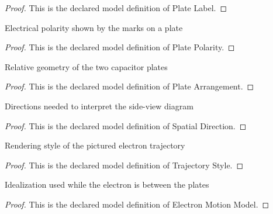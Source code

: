 \begin{proof}
  This is the declared model definition of Plate Label.
\end{proof}
\begin{definition}
  \label{def:physics:phyx-mini-0836:phyxminiproblems-problemphyxmini0836-platepolarity}
  Electrical polarity shown by the marks on a plate
\end{definition}
\begin{proof}
  This is the declared model definition of Plate Polarity.
\end{proof}
\begin{definition}
  \label{def:physics:phyx-mini-0836:phyxminiproblems-problemphyxmini0836-platearrangement}
  Relative geometry of the two capacitor plates
\end{definition}
\begin{proof}
  This is the declared model definition of Plate Arrangement.
\end{proof}
\begin{definition}
  \label{def:physics:phyx-mini-0836:phyxminiproblems-problemphyxmini0836-spatialdirection}
  Directions needed to interpret the side-view diagram
\end{definition}
\begin{proof}
  This is the declared model definition of Spatial Direction.
\end{proof}
\begin{definition}
  \label{def:physics:phyx-mini-0836:phyxminiproblems-problemphyxmini0836-trajectorystyle}
  Rendering style of the pictured electron trajectory
\end{definition}
\begin{proof}
  This is the declared model definition of Trajectory Style.
\end{proof}
\begin{definition}
  \label{def:physics:phyx-mini-0836:phyxminiproblems-problemphyxmini0836-electronmotionmodel}
  Idealization used while the electron is between the plates
\end{definition}
\begin{proof}
  This is the declared model definition of Electron Motion Model.
\end{proof}
